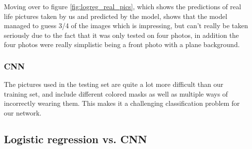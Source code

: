 \documentclass[../main.tex]{subfiles}
\begin{document}
Moving over to figure \ref{fig:logreg_real_pics}, which shows the predictions of real life pictures taken by us and predicted by the model, shows that the model managed to guess 3/4 of the images which is impressing, but can't really be taken seriously due to the fact that it was only tested on four photos, in addition the four photos were really simplistic being a front photo with a plane background.


\subsubsection{CNN}
The pictures used in the testing set are quite a lot more difficult than our training set, and include different colored masks as well as multiple ways of incorrectly wearing them. This makes it a challenging classification problem for our network.


\subsection{Logistic regression vs. CNN}
\end{document}
